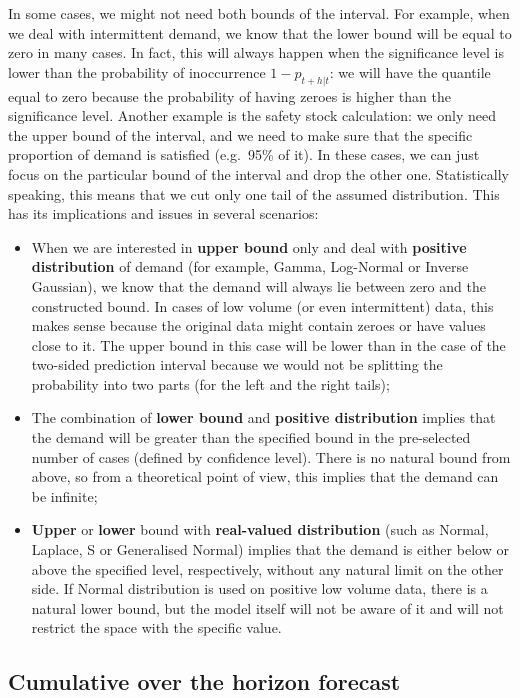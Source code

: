 \documentclass[
]{book}
\providecommand{\tightlist}{%
  \setlength{\itemsep}{0pt}\setlength{\parskip}{0pt}}
\theoremstyle{definition}
\theoremstyle{definition}
\theoremstyle{definition}
\theoremstyle{definition}
\theoremstyle{remark}
\begin{document}
In some cases, we might not need both bounds of the interval. For example, when we deal with intermittent demand, we know that the lower bound will be equal to zero in many cases. In fact, this will always happen when the significance level is lower than the probability of inoccurrence \(1-p_{t+h|t}\): we will have the quantile equal to zero because the probability of having zeroes is higher than the significance level. Another example is the safety stock calculation: we only need the upper bound of the interval, and we need to make sure that the specific proportion of demand is satisfied (e.g.~95\% of it). In these cases, we can just focus on the particular bound of the interval and drop the other one. Statistically speaking, this means that we cut only one tail of the assumed distribution. This has its implications and issues in several scenarios:

\begin{itemize}
\tightlist
\item
  When we are interested in \textbf{upper bound} only and deal with \textbf{positive distribution} of demand (for example, Gamma, Log-Normal or Inverse Gaussian), we know that the demand will always lie between zero and the constructed bound. In cases of low volume (or even intermittent) data, this makes sense because the original data might contain zeroes or have values close to it. The upper bound in this case will be lower than in the case of the two-sided prediction interval because we would not be splitting the probability into two parts (for the left and the right tails);
\item
  The combination of \textbf{lower bound} and \textbf{positive distribution} implies that the demand will be greater than the specified bound in the pre-selected number of cases (defined by confidence level). There is no natural bound from above, so from a theoretical point of view, this implies that the demand can be infinite;
\item
  \textbf{Upper} or \textbf{lower} bound with \textbf{real-valued distribution} (such as Normal, Laplace, S or Generalised Normal) implies that the demand is either below or above the specified level, respectively, without any natural limit on the other side. If Normal distribution is used on positive low volume data, there is a natural lower bound, but the model itself will not be aware of it and will not restrict the space with the specific value.
\end{itemize}

\hypertarget{forecastingADAMOtherCumulative}{%
\subsection{Cumulative over the horizon forecast}\label{forecastingADAMOtherCumulative}}
\end{document}
